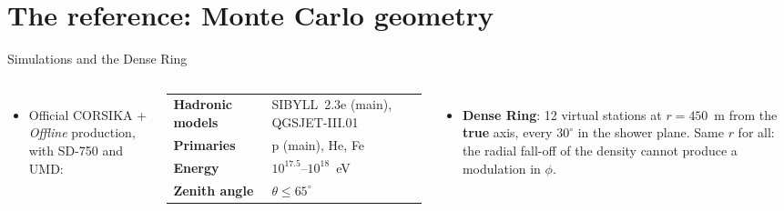 \documentclass[aspectratio=169,11pt]{beamer}
\begin{document}
\section{The reference: Monte Carlo geometry}

\begin{frame}{Simulations and the Dense Ring}
  \begin{columns}[c]
      \begin{itemize}
        \item Official CORSIKA + \emph{Offline} production, with SD-750 and UMD:
      \end{itemize}
      \vspace{0.1em}
      {\footnotesize
      \renewcommand{\arraystretch}{1.15}
      \hspace{1.2em}\begin{tabular}{@{}ll@{}}
        \textbf{Hadronic models} & SIBYLL~2.3e (main), QGSJET-III.01\\
        \textbf{Primaries} & p (main), He, Fe\\
        \textbf{Energy} & $10^{17.5}$--$10^{18}$~eV\\
        \textbf{Zenith angle} & $\theta\le65^\circ$\\
      \end{tabular}}
      \vspace{0.4em}
      \begin{itemize}
        \item \textbf{Dense Ring}: 12 virtual stations at $r=450$~m from the
          \textbf{true} axis, every $30^\circ$ in the shower plane. Same $r$ for all:
          the radial fall-off of the density cannot produce a modulation in $\phi$.
      \end{itemize}
      \centering


\end{columns}
\end{frame}
\end{document}
